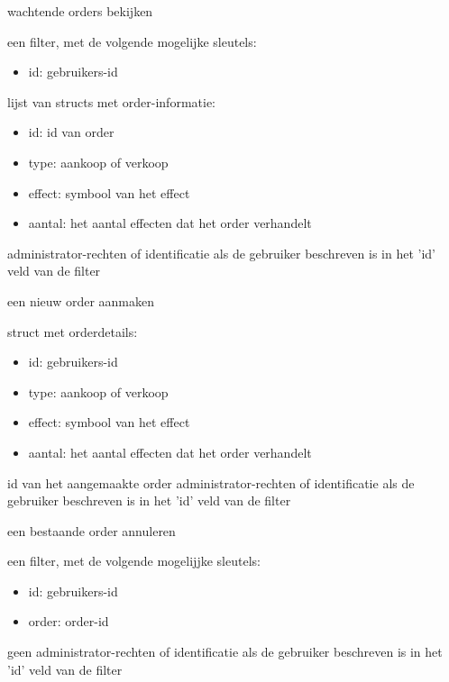 	{ wachtende orders bekijken }
	{ een filter, met de volgende mogelijke sleutels:
		\begin{itemize}
		\item{id: gebruikers-id}
		\end{itemize} }
	{ lijst van structs met order-informatie:
		\begin{itemize}
		\item{id: id van order}
		\item{type: aankoop of verkoop}
		\item{effect: symbool van het effect}
		\item{aantal: het aantal effecten dat het order verhandelt}
		\end{itemize} }
	{ administrator-rechten of identificatie als de gebruiker beschreven is in het 'id' veld van de filter }

	{ een nieuw order aanmaken }
	{ struct met orderdetails:
		\begin{itemize}
		\item{id: gebruikers-id}
		\item{type: aankoop of verkoop}
		\item{effect: symbool van het effect}
		\item{aantal: het aantal effecten dat het order verhandelt}
		\end{itemize} }
	{ id van het aangemaakte order }
	{ administrator-rechten of identificatie als de gebruiker beschreven is in het 'id' veld van de filter }

	{ een bestaande order annuleren }
	{ een filter, met de volgende mogelijjke sleutels:
		\begin{itemize}
		\item{id: gebruikers-id}
		\item{order: order-id}
		\end{itemize} }
	{ geen }
	{ administrator-rechten of identificatie als de gebruiker beschreven is in het 'id' veld van de filter }

